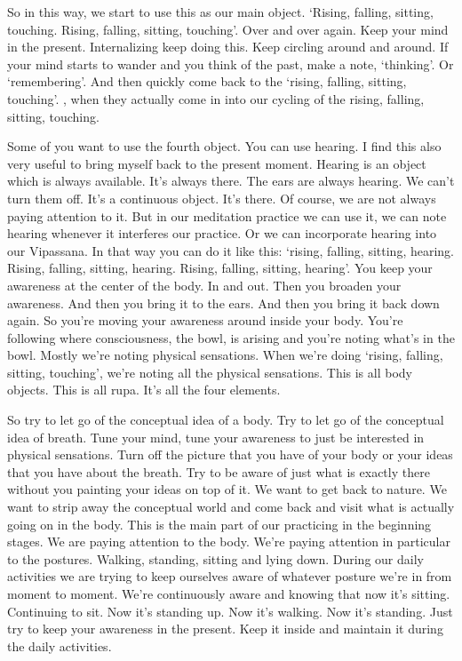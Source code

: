 \documentclass[letterpaper,10pt,english]{sphinxmanual}
\begin{document}
\sphinxAtStartPar
So in this way, we start to use this as our main object. ‘Rising, falling,
sitting,  touching.  Rising,  falling,  sitting,  touching’.  Over  and  over  again.
Keep your mind in the present. Internalizing keep doing this. Keep circling
around and around. If your mind starts to wander and you think of the past,
make a note, ‘thinking’. Or ‘remembering’. And then quickly come back to
the ‘rising, falling, sitting, touching’.
,  when  they  actually  come  in
into our cycling of the rising, falling, sitting, touching.

\sphinxAtStartPar
Some of you want to use the fourth object. You can use hearing. I find
this also very useful to bring myself back to the present moment. Hearing is
  an object which is always available. It’s always there. The ears are always
hearing. We can’t turn them off. It’s a continuous object. It’s there. Of course,
we are not always paying attention to it. But in our meditation practice we
can use it, we can note hearing whenever it interferes our practice. Or we can
incorporate hearing into our Vipassana. In that way you can do it like this:
‘rising, falling, sitting, hearing. Rising, falling, sitting, hearing. Rising, falling, sitting, hearing’. You keep your awareness at the center of the body. In
and out. Then you broaden your awareness. And then you bring it to the ears.
And then you bring it back down again. So you’re moving your awareness
around inside your body. You’re following where consciousness, the bowl,
is arising and you’re noting what’s in the bowl. Mostly we’re noting physical sensations. When we’re doing ‘rising, falling, sitting, touching’, we’re
noting all the physical sensations. This is all body objects. This is all rupa.
It’s all the four elements.

\sphinxAtStartPar
So try to let go of the conceptual idea of a body. Try to let go of the
conceptual idea of breath. Tune your mind, tune your awareness to just be
interested in physical sensations. Turn off the picture that you have of your
body or your ideas that you have about the breath. Try to be aware of just
what is exactly there without you painting your ideas on top of it. We want
to get back to nature. We want to strip away the conceptual world and come
back and visit what is actually going on in the body. This is the main part of
our practicing in the beginning stages. We are paying attention to the body.
We’re paying attention in particular to the postures. Walking, standing, sitting and lying down. During our daily activities we are trying to keep ourselves aware of whatever posture we’re in from moment to moment. We’re
continuously  aware  and  knowing  that  now  it’s  sitting.  Continuing  to  sit.
Now it’s standing up. Now it’s walking. Now it’s standing. Just try to keep
your awareness in the present. Keep it inside and maintain it during the daily
activities.
\end{document}
